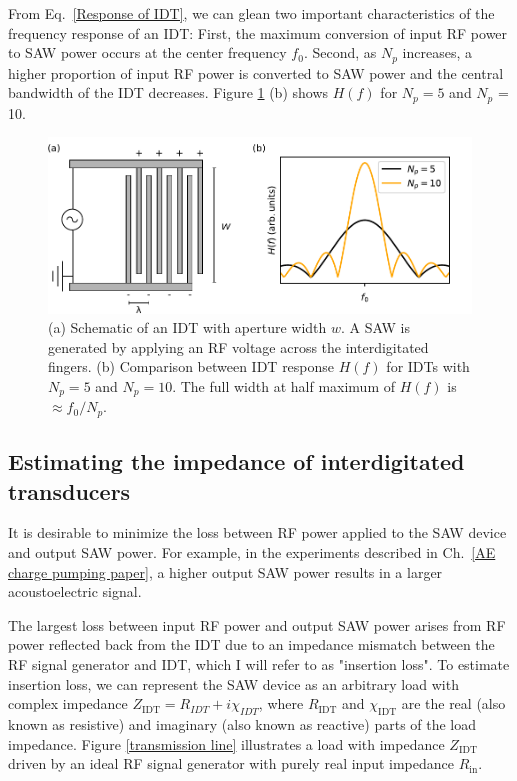 \documentclass[double,12pt,1in,seploa]{beavtex}
\let\Oldsubsection\subsection
\renewcommand{\subsection}{\FloatBarrier\Oldsubsection}
\begin{document}
From Eq.\ \ref{Response of IDT}, we can glean two important characteristics of the frequency response of an IDT: First, the maximum conversion of input RF power to SAW power occurs at the center frequency $f_0$. Second, as $N_p$ increases, a higher proportion of input RF power is converted to SAW power and the central bandwidth of the IDT decreases. Figure \ref{SAW diagram} (b) shows $H(f)$ for $N_p = 5$ and $N_p$ = 10.

\begin{figure}
    \includegraphics{SAW diagram.pdf}
    \caption{(a) Schematic of an IDT with aperture width $w$. A SAW is generated by applying an RF voltage across the interdigitated fingers. (b) Comparison between IDT response $H(f)$ for IDTs with $N_p = 5$ and $N_p = 10$. The full width at half maximum of $H(f)$ is $\approx f_0/N_p$.}
    \label{SAW diagram}
\end{figure}


\subsection{Estimating the impedance of interdigitated transducers}

It is desirable to minimize the loss between RF power applied to the SAW device and output SAW power. For example, in the experiments described in Ch.\ \ref{AE charge pumping paper}, a higher output SAW power results in a larger acoustoelectric signal. 

The largest loss between input RF power and output SAW power arises from RF power reflected back from the IDT due to an impedance mismatch between the RF signal generator and IDT, which I will refer to as "insertion loss". To estimate insertion loss, we can represent the SAW device as an arbitrary load with complex impedance $Z_{\mathrm{IDT}} = R_{IDT} + i\chi_{IDT}$, where $R_{\mathrm{IDT}}$ and $\chi_{\mathrm{IDT}}$ are the real (also known as resistive) and imaginary (also known as reactive) parts of the load impedance. Figure \ref{transmission line} illustrates a load with impedance $Z_{\mathrm{IDT}}$ driven by an ideal RF signal generator with purely real input impedance $R_{\mathrm{in}}$.
\end{document}
